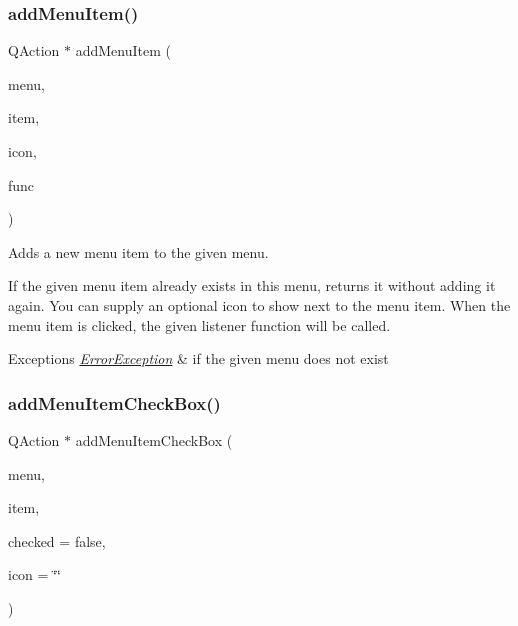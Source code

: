 \subsubsection{\texorpdfstring{add\+Menu\+Item()}{addMenuItem()}\hspace{0.1cm}{\footnotesize\ttfamily [2/2]}}
{\footnotesize\ttfamily Q\+Action $\ast$ add\+Menu\+Item (\begin{DoxyParamCaption}\item[{const std\+::string \&}]{menu,  }\item[{const std\+::string \&}]{item,  }\item[{const std\+::string \&}]{icon,  }\item[{G\+Event\+Listener\+Void}]{func }\end{DoxyParamCaption})\hspace{0.3cm}{\ttfamily [virtual]}}



Adds a new menu item to the given menu. 

If the given menu item already exists in this menu, returns it without adding it again. You can supply an optional icon to show next to the menu item. When the menu item is clicked, the given listener function will be called. 
\begin{DoxyExceptions}{Exceptions}
{\em \mbox{\hyperlink{classErrorException}{Error\+Exception}}} & if the given menu does not exist \\
\hline
\end{DoxyExceptions}
\mbox{\label{classGWindow_ae363de5d4c0d5848a5936563b12c3288}} 
\subsubsection{\texorpdfstring{add\+Menu\+Item\+Check\+Box()}{addMenuItemCheckBox()}\hspace{0.1cm}{\footnotesize\ttfamily [1/2]}}
{\footnotesize\ttfamily Q\+Action $\ast$ add\+Menu\+Item\+Check\+Box (\begin{DoxyParamCaption}\item[{const std\+::string \&}]{menu,  }\item[{const std\+::string \&}]{item,  }\item[{bool}]{checked = {\ttfamily false},  }\item[{const std\+::string \&}]{icon = {\ttfamily \char`\"{}\char`\"{}} }\end{DoxyParamCaption})\hspace{0.3cm}{\ttfamily [virtual]}}



